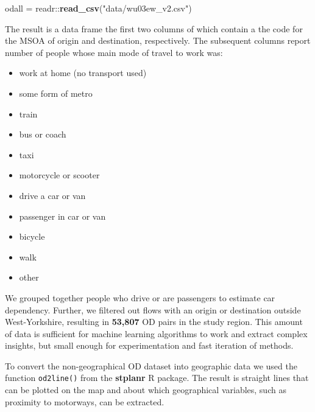 \documentclass[11pt]{article}
\newenvironment{Shaded}{\begin{snugshade}}{\end{snugshade}}
\newcommand{\KeywordTok}[1]{\textcolor[rgb]{0.13,0.29,0.53}{\textbf{{#1}}}}
\newcommand{\StringTok}[1]{\textcolor[rgb]{0.31,0.60,0.02}{{#1}}}
\newcommand{\NormalTok}[1]{{#1}}
\providecommand{\tightlist}{%
  \setlength{\itemsep}{0pt}\setlength{\parskip}{0pt}}
\begin{document}
\begin{Shaded}
\begin{Highlighting}[]
\NormalTok{odall =}\StringTok{ }\NormalTok{readr::}\KeywordTok{read_csv}\NormalTok{(}\StringTok{"data/wu03ew_v2.csv"}\NormalTok{)}
\end{Highlighting}
\end{Shaded}

The result is a data frame the first two columns of which contain a the
code for the MSOA of origin and destination, respectively. The
subsequent columns report number of people whose main mode of travel to
work was:

\begin{itemize}
\tightlist
\item
  work at home (no transport used)
\item
  some form of metro
\item
  train
\item
  bus or coach
\item
  taxi
\item
  motorcycle or scooter
\item
  drive a car or van
\item
  passenger in car or van
\item
  bicycle
\item
  walk
\item
  other
\end{itemize}

We grouped together people who drive or are passengers to estimate car
dependency. Further, we filtered out flows with an origin or destination
outside West-Yorkshire, resulting in \textbf{53,807} OD pairs in the
study region. This amount of data is sufficient for machine learning
algorithms to work and extract complex insights, but small enough for
experimentation and fast iteration of methods.

To convert the non-geographical OD dataset into geographic data we used
the function \texttt{od2line()} from the \textbf{stplanr} R package. The
result is straight lines that can be plotted on the map and about which
geographical variables, such as proximity to motorways, can be
extracted.
\end{document}
